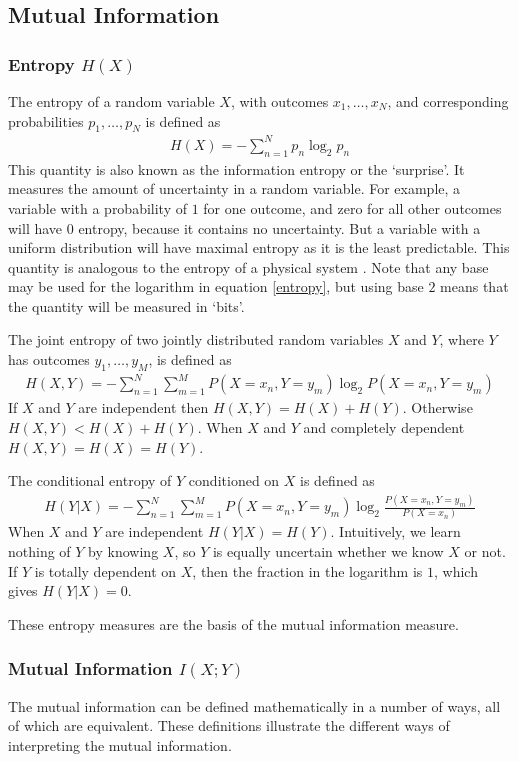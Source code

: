 \documentclass[a4paper,12pt]{article}
\theoremstyle{definition}
\begin{document}
\subsection{Mutual Information}
\subsubsection{Entropy $H(X)$}
The entropy of a random variable $X$, with outcomes $x_1, \dots, x_N$, and corresponding probabilities $p_1, \dots, p_N$ is defined as
\begin{align}\label{entropy}
H(X) = -\sum_{n=1}^N p_n \log _2 p_n
\end{align}
This quantity is also known as the information entropy or the `surprise'. It measures the amount of uncertainty in a random variable. For example, a variable with a probability of $1$ for one outcome, and zero for all other outcomes will have 0 entropy, because it contains no uncertainty. But a variable with a uniform distribution will have maximal entropy as it is the least predictable. This quantity is analogous to the entropy of a physical system \cite{shannon}. Note that any base may be used for the logarithm in equation \ref{entropy}, but using base $2$ means that the quantity will be measured in `bits'.

The joint entropy of two jointly distributed random variables $X$ and $Y$, where $Y$ has outcomes $y_1, \dots, y_M$, is defined as
\begin{align}\label{joint_entropy}
H(X, Y) = -\sum_{n=1}^N \sum_{m=1}^M P(X=x_n, Y=y_m) \log _2 P(X=x_n, Y=y_m)
\end{align}
If $X$ and $Y$ are independent then $H(X,Y) = H(X) + H(Y)$. Otherwise $H(X,Y) < H(X) + H(Y)$. When $X$ and $Y$ and completely dependent $H(X,Y) = H(X) = H(Y)$.

The conditional entropy of $Y$ conditioned on $X$ is defined as
\begin{align}
H(Y|X) = -\sum_{n=1}^N \sum_{m=1}^M P(X=x_n, Y=y_m) \log _2 \frac{P(X=x_n, Y=y_m)}{P(X=x_n)}
\end{align}
When $X$ and $Y$ are independent $H(Y|X) = H(Y)$. Intuitively, we learn nothing of $Y$ by knowing $X$, so $Y$ is equally uncertain whether we know $X$ or not. If $Y$ is totally dependent on $X$, then the fraction in the logarithm is $1$, which gives $H(Y|X) = 0$.

These entropy measures are the basis of the mutual information measure.

\subsubsection{Mutual Information $I(X;Y)$}
The mutual information can be defined mathematically in a number of ways, all of which are equivalent. These definitions illustrate the different ways of interpreting the mutual information.
\end{document}
